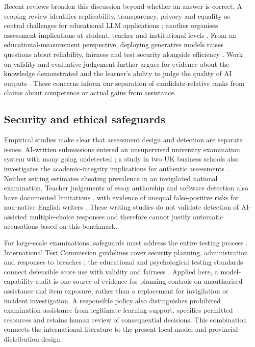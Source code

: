 \documentclass[preprint,12pt,authoryear,nonatbib]{elsarticle}
\begin{document}
Recent reviews broaden this discussion beyond whether an answer is correct. A scoping review identifies replicability, transparency, privacy and equality as central challenges for educational LLM applications \citep{yan2024}; another organises assessment implications at student, teacher and institutional levels \citep{xia2024assessment}. From an educational-measurement perspective, deploying generative models raises questions about reliability, fairness and test security alongside efficiency \citep{hao2024}. Work on validity and evaluative judgement further argues for evidence about the knowledge demonstrated and the learner's ability to judge the quality of AI outputs \citep{kaldaras2024,bearman2024}. These concerns inform our separation of candidate-relative ranks from claims about competence or actual gains from assistance.

\subsection{Security and ethical safeguards}
Empirical studies make clear that assessment design and detection are separate issues. AI-written submissions entered an unsupervised university examination system with many going undetected \citep{scarfe2024}; a study in two UK business schools also investigates the academic-integrity implications for authentic assessments \citep{kofinas2025}. Neither setting estimates cheating prevalence in an invigilated national examination. Teacher judgements of essay authorship and software detection also have documented limitations \citep{fleckenstein2024,weberwulff2023}, with evidence of unequal false-positive risks for non-native English writers \citep{liang2023}. These writing studies do not validate detection of AI-assisted multiple-choice responses and therefore cannot justify automatic accusations based on this benchmark.

For large-scale examinations, safeguards must address the entire testing process \citep{dawson2021}. International Test Commission guidelines cover security planning, administration and responses to breaches \citep{itc2014security}; the educational and psychological testing standards connect defensible score use with validity and fairness \citep{aera2014}. Applied here, a model-capability audit is one source of evidence for planning controls on unauthorised assistance and item exposure, rather than a replacement for invigilation or incident investigation. A responsible policy also distinguishes prohibited examination assistance from legitimate learning support, specifies permitted resources and retains human review of consequential decisions. This combination connects the international literature to the present local-model and provincial-distribution design.
\end{document}
